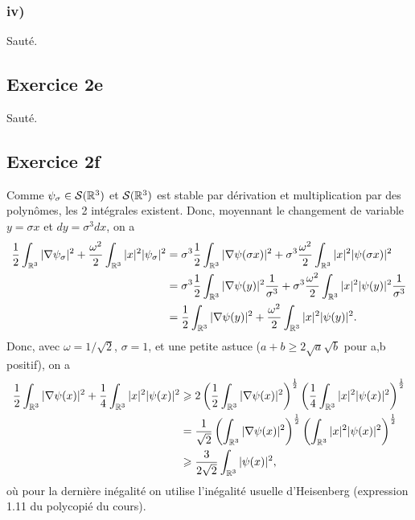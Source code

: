 \subsubsection*{iv)}
Sauté.


\subsection*{Exercice 2e}
Sauté.


\subsection*{Exercice 2f}

Comme $\psi_\sigma \in \mathcal{S}(\mathbb{R}^3)$ et $\mathcal{S}(\mathbb{R}^3)$ est stable par dérivation
et multiplication par des polynômes, les 2 intégrales existent.
Donc, moyennant le changement de variable $y = \sigma x$ et
$dy = \sigma^3 dx$, on a
\begin{align}
    \ud \int_{\R^3} |\nabla \psis|^2 +
    \frac{\omega^2}{2} \int_{\R^3} |x|^2 |\psis|^2
    &= \sigma^3 \ud \int_{\R^3} |\nabla \psi(\sigma x)|^2
    + \sigma^3 \frac{\omega^2}{2} \int_{\R^3} |x|^2 |\psi(\sigma x)|^2 \\
%
    &= \sigma^3 \ud \int_{\R^3} |\nabla \psi(y)|^2 \udd{\sigma^3}
    + \sigma^3 \frac{\omega^2}{2} \int_{\R^3} |x|^2 |\psi(y)|^2 \udd{\sigma^3} \\
%
    &= \ud \int_{\R^3} |\nabla \psi(y)|^2
    + \frac{\omega^2}{2} \int_{\R^3} |x|^2 |\psi(y)|^2.
\end{align}
%
Donc, avec $\omega = 1/\sqrt{2}$, $\sigma = 1$,
et une petite astuce
($a + b \geqslant 2\sqrt{a}\sqrt{b}$ pour a,b positif),
on a
\begin{align}
    \ud \int_{\R^3} |\nabla \psi(x)|^2
    + \udd{4} \int_{\R^3} |x|^2 |\psi(x)|^2
%
    & \geqslant 2 \left( \ud \int_{\R^3} |\nabla \psi(x)|^2 \right)^\ud
    \left( \udd{4} \int_{\R^3} |x|^2 |\psi(x)|^2 \right)^\ud \\
%
    &= \udd{\sqrt{2}} \left( \int_{\R^3} |\nabla \psi(x)|^2 \right)^\ud
    \left( \int_{\R^3} |x|^2 |\psi(x)|^2 \right)^\ud \\
%
    & \geqslant \frac{3}{2 \sqrt{2}}
    \int_{\R^3} |\psi(x)|^2,
\end{align}
%
où pour la dernière inégalité on utilise
l'inégalité usuelle d'Heisenberg
(expression 1.11 du polycopié du cours).

